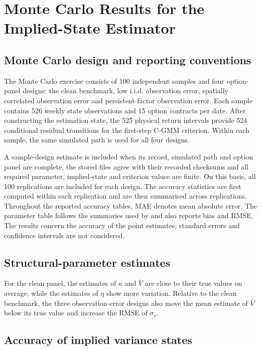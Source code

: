 \documentclass[11pt,a4paper,notitlepage]{article}
\numberwithin{equation}{section}
\begin{document}
\section{Monte Carlo Results for the Implied-State Estimator}
\label{sec:is_cgmm_results}

\subsection{Monte Carlo design and reporting conventions}

The Monte Carlo exercise consists of 100 independent samples and four option-panel designs: the clean benchmark, low i.i.d. observation error, spatially correlated observation error and persistent-factor observation error. Each sample contains 526 weekly state observations and 15 option contracts per date. After constructing the estimation state, the 525 physical return intervals provide 524 conditional residual transitions for the first-step C-GMM criterion. Within each sample, the same simulated path is used for all four designs.

A sample-design estimate is included when its record, simulated path and option panel are complete, the stored files agree with their recorded checksums and all required parameter, implied-state and criterion values are finite. On this basis, all 100 replications are included for each design. The accuracy statistics are first computed within each replication and are then summarised across replications. Throughout the reported accuracy tables, MAE denotes mean absolute error. The parameter table follows the summaries used by \citet{boswijk2024estimating} and also reports bias and RMSE. The results concern the accuracy of the point estimates; standard errors and confidence intervals are not considered.

\subsection{Structural-parameter estimates}



For the clean panel, the estimates of $\kappa$ and $\bar V$ are close to their true values on average, while the estimates of $\eta$ show more variation. Relative to the clean benchmark, the three observation-error designs also move the mean estimate of $\bar V$ below its true value and increase the RMSE of $\sigma_v$.

\subsection{Accuracy of implied variance states}
\end{document}
